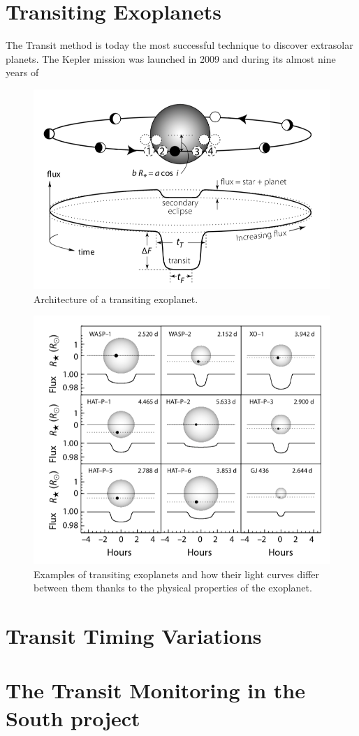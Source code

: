 \section{Transiting Exoplanets}
The Transit method is today the most successful technique to discover extrasolar planets. The Kepler mission was launched in 2009 and during its almost nine years of 
\begin{figure}[H]
\centering
\includegraphics[width=0.8\columnwidth]{imagenes/transit.png}
\caption{Architecture of a transiting exoplanet.}
\label{transit}
\end{figure}

\begin{figure}[H]
\includegraphics[width=1.0\columnwidth]{imagenes/transit_examples.png}
\caption{Examples of transiting exoplanets and how their light curves differ between them thanks to the physical properties of the exoplanet.}
\label{transit_examples}
\end{figure}



\section{Transit Timing Variations}

\section{The Transit Monitoring in the South project}